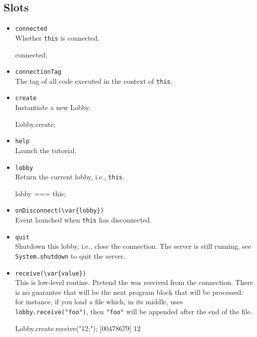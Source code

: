 \subsection{Slots}
\begin{itemize}
\item \lstinline|connected|\\
  Whether \lstinline|this| is connected.
\begin{urbiassert}[firstnumber=last]
connected;
\end{urbiassert}

\item \lstinline|connectionTag|\\
  The tag of all code executed in the context of \lstinline|this|.

\item \lstinline|create|\\
  Instantiate a new Lobby.
\begin{urbiassert}[firstnumber=last]
Lobby.create;
\end{urbiassert}

\item \lstinline|help|\experimental\\
  Launch the tutorial.

\item \lstinline|lobby|\\
  Return the current lobby, i.e., \lstinline|this|.
\begin{urbiassert}[firstnumber=last]
lobby === this;
\end{urbiassert}

\item \lstinline|onDisconnect(\var{lobby})|\\
  Event launched when \lstinline|this| has disconnected.

\item \lstinline|quit|\\
  Shutdown this lobby, i.e., close the connection.  The server is
  still running, see \lstinline|System.shutdown| to quit the server.

\item \lstinline|receive(\var{value})|\\
  This is low-level routine.  Pretend the 
   was received from the connection.  There is no guarantee
  that  will be the next program block that will be
  processed: for instance, if you load a file which, in its middle,
  uses \lstinline|lobby.receive("foo")|, then \lstinline|"foo"| will
  be appended after the end of the file.
\begin{urbiscript}[firstnumber=last]
Lobby.create.receive("12;");
[00478679] 12
\end{urbiscript}


\end{itemize}

